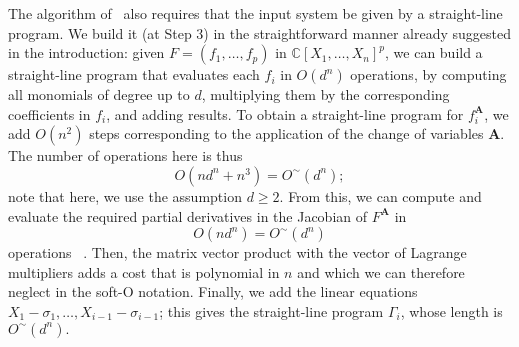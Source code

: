 \documentclass[12pt]{article}
\def\mA{{\bm A}}
\def\C{\mathbb{C}}
\begin{document}
The algorithm of~\cite{SH} also requires that the input system be
given by a straight-line program. We build it (at Step 3) in the
straightforward manner already suggested in the introduction: given
$F=(f_1,\hdots,f_p)$ in $\C[X_1,\hdots,X_n]^p$, we can build a
straight-line program that evaluates each $f_i$ in $O(d^n)$
operations, by computing all monomials of degree up to $d$,
multiplying them by the corresponding coefficients in $f_i$, and
adding results. To obtain a straight-line program for $f_i^\mA$, we
add $O(n^2)$ steps corresponding to the application of the change of
variables $\mA$. The number of operations here is thus
\[
O(nd^n + n^3) = O^{\sim}(d^n);
\]
note that here, we use the assumption $d \ge 2$.
From this, we can compute and evaluate the required partial
derivatives in the Jacobian of $F^\mA$ in
\[
O(nd^n) = O^{\sim}(d^n)
\]
operations ~\cite{BaSt83}.  Then, the matrix vector product with the
vector of Lagrange multipliers adds a cost that is polynomial in $n$
and which we can therefore neglect in the soft-O notation. Finally, we
add the linear equations $X_1-\sigma_1,\hdots,X_{i-1}-\sigma_{i-1}$;
this gives the straight-line program $\Gamma_i$, whose length is
$O^{\sim}(d^n).$
\end{document}
